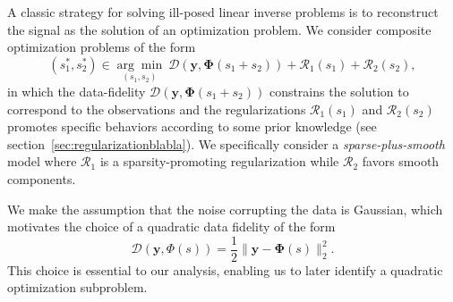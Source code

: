 \documentclass[12pt]{article}
\begin{document}
    A classic strategy for solving ill-posed linear inverse problems is to reconstruct the signal as the solution of an optimization problem. We consider composite optimization problems of the form
    \begin{equation} \label{eq:compositepb}
        (s_1^*,s_2^*) \in \underset{(s_1,s_2)}{\arg\min} \ \mathcal{D}(\bm{y}, \bm{\Phi}(s_1 + s_2)) + \mathcal{R}_1 (s_1) + \mathcal{R}_2(s_2),
    \end{equation}
    in which the data-fidelity $\mathcal{D}(\bm{y}, \bm{\Phi}(s_1 + s_2))$ constrains the solution to correspond to the observations and the regularizations $\mathcal{R}_1 (s_1)$ and $\mathcal{R}_2(s_2)$ promotes specific behaviors according to some prior knowledge (see section~\ref{sec:regularizationblabla}). We specifically consider a \emph{sparse-plus-smooth} model where $\mathcal{R}_1$ is a sparsity-promoting regularization while $\mathcal{R}_2$ favors smooth components.

    We make the assumption that the noise corrupting the data is Gaussian, which motivates the choice of a quadratic data fidelity of the form
    \begin{equation*}
        \mathcal{D} (\bm{y}, \Phi(s)) =  \frac{1}{2} \| \bm{y} - \bm{\Phi}(s) \|_2^2.
    \end{equation*}
    This choice is essential to our analysis, enabling us to later identify a quadratic optimization subproblem. 

\end{document}
